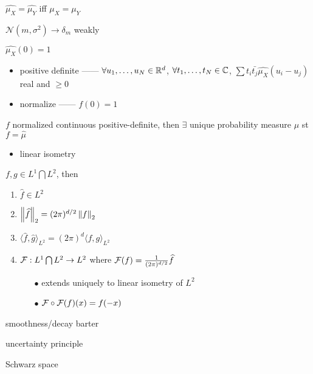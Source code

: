 \begin{fact}
    $\widehat{\mu_X} = \widehat{\mu_Y}$ iff $\mu_X = \mu_Y$
\end{fact}

\begin{example}
    $\mathcal{N}(m ,\sigma^2) \rightarrow \delta_m$ weakly
\end{example}

\begin{fact}
    $\widehat{\mu_X}(0) = 1$
\end{fact}

\begin{itemize}
    \item positive definite ------ $\forall u_1, \dots, u_N \in \mathbb{R}^d$, $\forall t_1, \dots, t_N \in \mathbb{C}$, $\sum t_{i}\bar{t_j}\widehat{\mu_X}(u_i - u_j)$ real and $\geq 0$
    \item normalize ------ $f(0) = 1$
\end{itemize}

\begin{fact}
    $f$ normalized continuous positive-definite, then $\exists$ unique probability measure $\mu$ st $f = \widehat{\mu}$
\end{fact}

\begin{itemize}
    \item linear isometry
\end{itemize}

\begin{thm}
    $f, g \in L^1 \bigcap L^2$, then
    \begin{enumerate}
        \item $\widehat{f} \in L^2$
        \item $\left\lVert\widehat{f}\right\rVert_2 = (2\pi)^{d/2}\left\lVert f\right\rVert_2$
        \item $\langle \widehat{f}, \widehat{g} \rangle_{L^2} = (2\pi)^d\langle f, g \rangle_{L^2}$
        \item $\mathcal{F}:L^1 \bigcap L^2 \rightarrow L^2$ where $\mathcal{F}(f) = \frac{1}{(2\pi)^{d/2}}\widehat{f}$
        \begin{itemize}
            \item[$\bullet$] extends uniquely to linear isometry of $L^2$
            \item[$\bullet$] $\mathcal{F} \circ \mathcal{F}(f)(x) = f(-x)$
        \end{itemize}
    \end{enumerate}
\end{thm}

\begin{fact}
    smoothness/decay barter
\end{fact}

\begin{fact}
    uncertainty principle
\end{fact}

\begin{fact}
    Schwarz space
\end{fact}